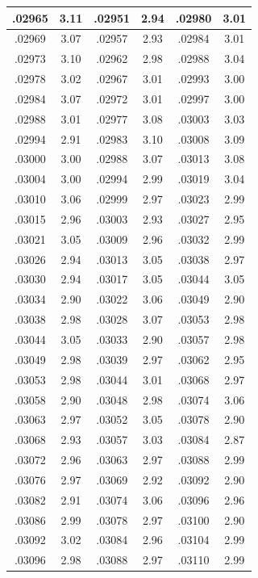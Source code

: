 \documentclass[10pt,twoside]{report}
\begin{document}
\begin{appendices}
\begin{longtable}{|c|c||c|c||c|c|}
.02965 & 3.11 & .02951 & 2.94 & .02980 & 3.01\\\hline
.02969 & 3.07 & .02957 & 2.93 & .02984 & 3.01\\\hline
.02973 & 3.10 & .02962 & 2.98 & .02988 & 3.04\\\hline
.02978 & 3.02 & .02967 & 3.01 & .02993 & 3.00\\\hline
.02984 & 3.07 & .02972 & 3.01 & .02997 & 3.00\\\hline
.02988 & 3.01 & .02977 & 3.08 & .03003 & 3.03\\\hline
.02994 & 2.91 & .02983 & 3.10 & .03008 & 3.09\\\hline
.03000 & 3.00 & .02988 & 3.07 & .03013 & 3.08\\\hline
.03004 & 3.00 & .02994 & 2.99 & .03019 & 3.04\\\hline
.03010 & 3.06 & .02999 & 2.97 & .03023 & 2.99\\\hline
.03015 & 2.96 & .03003 & 2.93 & .03027 & 2.95\\\hline
.03021 & 3.05 & .03009 & 2.96 & .03032 & 2.99\\\hline
.03026 & 2.94 & .03013 & 3.05 & .03038 & 2.97\\\hline
.03030 & 2.94 & .03017 & 3.05 & .03044 & 3.05\\\hline
.03034 & 2.90 & .03022 & 3.06 & .03049 & 2.90\\\hline
.03038 & 2.98 & .03028 & 3.07 & .03053 & 2.98\\\hline
.03044 & 3.05 & .03033 & 2.90 & .03057 & 2.98\\\hline
.03049 & 2.98 & .03039 & 2.97 & .03062 & 2.95\\\hline
.03053 & 2.98 & .03044 & 3.01 & .03068 & 2.97\\\hline
.03058 & 2.90 & .03048 & 2.98 & .03074 & 3.06\\\hline
.03063 & 2.97 & .03052 & 3.05 & .03078 & 2.90\\\hline
.03068 & 2.93 & .03057 & 3.03 & .03084 & 2.87\\\hline
.03072 & 2.96 & .03063 & 2.97 & .03088 & 2.99\\\hline
.03076 & 2.97 & .03069 & 2.92 & .03092 & 2.90\\\hline
.03082 & 2.91 & .03074 & 3.06 & .03096 & 2.96\\\hline
.03086 & 2.99 & .03078 & 2.97 & .03100 & 2.90\\\hline
.03092 & 3.02 & .03084 & 2.96 & .03104 & 2.99\\\hline
.03096 & 2.98 & .03088 & 2.97 & .03110 & 2.99\\\hline

\end{longtable}
\end{appendices}
\end{document}
